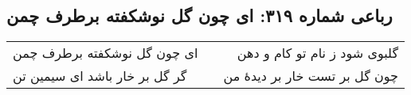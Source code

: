 \begin{center}
\section*{رباعی شماره ۳۱۹: ای چون گل نوشکفته برطرف چمن}
\label{sec:sh319}
\begin{longtable}{l p{0.5cm} r}
ای چون گل نوشکفته برطرف چمن
&&
گلبوی شود ز نام تو کام و دهن
\\
گر گل بر خار باشد ای سیمین تن
&&
چون گل بر تست خار بر دیدهٔ من
\\
\end{longtable}
\end{center}
